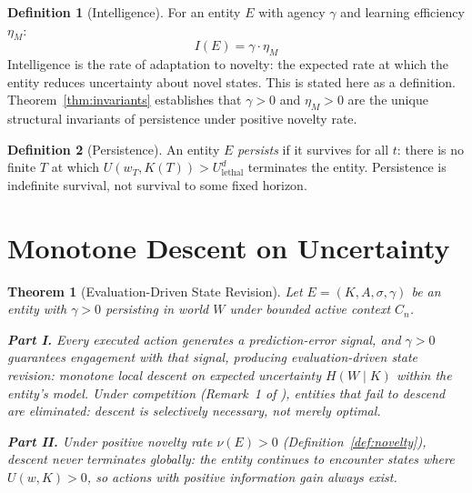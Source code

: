 \documentclass[11pt]{article}
\newtheorem{theorem}{Theorem}
\theoremstyle{definition}
\newtheorem{definition}{Definition}
\theoremstyle{remark}
\begin{document}
\begin{definition}[Intelligence]
\label{def:intelligence}
For an entity $E$ with agency $\gamma$ and learning efficiency $\eta_M$:
\[
I(E) = \gamma \cdot \eta_M
\]
Intelligence is the rate of adaptation to novelty: the expected rate at
which the entity reduces uncertainty about novel states. This is stated
here as a definition. Theorem~\ref{thm:invariants} establishes that
$\gamma > 0$ and $\eta_M > 0$ are the unique structural invariants
of persistence under positive novelty rate.
\end{definition}

\begin{definition}[Persistence]
\label{def:persistence}
An entity $E$ \emph{persists} if it survives for all $t$: there is no
finite $T$ at which $U(w_T, K(T)) > U_{\mathrm{lethal}}^d$ terminates
the entity. Persistence is indefinite survival, not survival to some
fixed horizon.
\end{definition}

\section{Monotone Descent on Uncertainty}
\label{sec:descent}

\begin{theorem}[Evaluation-Driven State Revision]
\label{thm:descent}
Let $E = (K, A, \sigma, \gamma)$ be an entity with $\gamma > 0$ persisting in
world $W$ under bounded active context $C_n$.

\textbf{Part I.} Every executed action generates a prediction-error
signal, and $\gamma > 0$ guarantees engagement with that signal,
producing evaluation-driven state revision: monotone local descent on
expected uncertainty $H(W \mid K)$ within the entity's model. Under
competition (Remark~1 of \cite{McCarthy2026a}), entities that fail to
descend are eliminated: descent is selectively necessary, not merely
optimal.

\textbf{Part II.} Under positive novelty rate $\nu(E) > 0$
(Definition~\ref{def:novelty}), descent never terminates globally:
the entity continues to encounter states where $U(w,K) > 0$, so
actions with positive information gain always exist.
\end{theorem}
\end{document}
